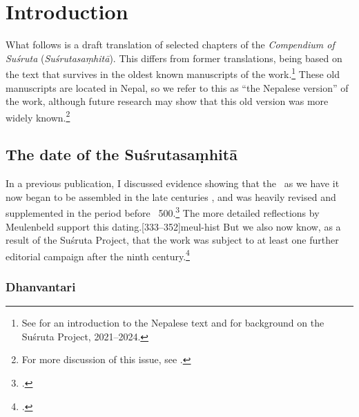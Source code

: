 
\chapter{Introduction}

What follows is a draft translation of selected chapters of the
\emph{Compendium of Suśruta} (\emph{Suśrutasaṃhitā}).  This differs
from former translations, being based on the text that survives in the
oldest known manuscripts of the work.\footnote{See \cite{wuja-2023}
    for an introduction to the Nepalese text and \cite{wuja-2021b} for
    background on the Suśruta Project, 2021--2024.}  These old manuscripts
    are located in Nepal, so we refer to this as “the Nepalese version” of
    the work, although future research may show that this old version was
    more widely known.\footnote{For more discussion of this issue, see 
    \cite[Introduction and ch.\,2]{wuja-2023}.}  
   
\section{The date of the Suśrutasaṃhitā}

In a previous publication, I discussed evidence showing that the \SS\
as we have it now began to be assembled in the late centuries \BC, and
was heavily revised and supplemented in the period before \CE\
500.\footcite[63--64]{wuja-2003}  The more detailed reflections by
Meulenbeld support this dating.\fvolcite{1A}[333--352]{meul-hist}  But
we also now know, as a result of the Suśruta Project, that the work
was subject to at least one further editorial campaign after the ninth
century.\footcite[16--26]{wuja-2023} 

\subsection{Dhanvantari}

